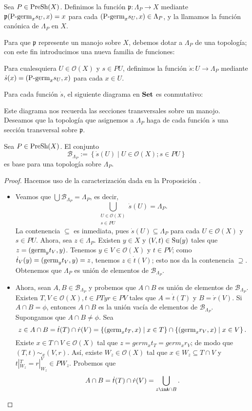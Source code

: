 \begin{Def}
   Sea $P\in\normalfont{\text{PreSh}}(X)$. Definimos la función $\mathfrak{p}:\Lambda_P\to X$ mediante $\mathfrak{p}(\normalfont{\text{P-germ}}_{x}s_{U},x)=x$ para cada $(\normalfont{\text{P-germ}}_{x}s_{U},x)\in\Lambda_P$, y la llamamos la función canónica de $\Lambda_P$ en $X$. 
\end{Def}
Para que $\mathfrak{p}$ represente un manojo sobre $X$, debemos dotar a $\Lambda_P$ de una topología; con este fin introducimos una nueva familia de funciones:
\begin{Def}
   Para cualesquiera $U\in\mathcal{O}(X)$ y $s\in PU$, definimos la función $\dot{s}:U\to\Lambda_P$ mediante $\dot{s}(x)=(\normalfont{\text{P-germ}}_{x}s_{U},x)$ para cada $x\in U$.
\end{Def}
Para cada función $\dot{s}$, el siguiente diagrama en $\normalfont{\textbf{Set}}$ es conmutativo:
   
Este diagrama nos recuerda las secciones transversales sobre un manojo. Deseamos que la topología que asignemos a $\Lambda_P$ haga de cada función $\dot{s}$ una sección transversal sobre $\mathfrak{p}$.
\begin{Prop}
   Sea $P\in\normalfont{\text{PreSh}}(X)$. El conjunto
   $$
      \mathcal{B}_{\Lambda_P}:=\left\lbrace \dot{s}(U)\mid U\in\mathcal{O}(X);s\in PU\right\rbrace
   $$
   es base para una topología sobre $\Lambda_P$.
\end{Prop}
\begin{proof}
   Hacemos uso de la caracterización dada en la Proposición .
   \begin{itemize}
      \item Veamos que $\bigcup \mathcal{B}_{\Lambda_P}=\Lambda_P$, es decir,
      $$
         \bigcup_{\substack{U\in\mathcal{O}(X) \\ s\in PU}}\dot{s}(U)=\Lambda_P.
      $$
      La contenencia $\subseteq$ es inmediata, pues $\dot{s}(U)\subseteq\Lambda_P$ para cada $U\in\mathcal{O}(X)$ y $s\in PU$. Ahora, sea $z\in\Lambda_{P}$. Existen $y\in X$ y $(V,t)\in\normalfont{\text{Su}}(y)$ tales que $z=(\normalfont{\text{germ}}_{y}t_{V},y)$. Tenemos $y\in V\in\mathcal{O}(X)$ y $t\in PV$; como $\dot{t}_{V}(y)=(\normalfont{\text{germ}}_{y}t_{V},y)=z$, tenemos $z\in\dot{t}(V)$; esto nos da la contenencia $\supseteq$. Obtenemos que $\Lambda_P$ es unión de elementos de $\mathcal{B}_{\Lambda_P}$.
   \item Ahora, sean $A,B\in\mathcal{B}_{\Lambda_P}$ y probemos que $A\cap B$ es unión de elementos de $\mathcal{B}_{\Lambda_P}$. Existen $T,V\in\mathcal{O}(X), t\in PT y r\in PV$ tales que $A=\dot{t}(T)$ y $B=\dot{r}(V)$. Si $A\cap B=\phi$, entonces $A\cap B$ es la unión vacía de elementos de $\mathcal{B}_{\Lambda_P}$. Supongamos que $A\cap B\neq\phi$. Sea
      $$ 
         z\in A\cap B =\dot{t}(T)\cap\dot{r}(V)=\left\lbrace (\normalfont{\text{germ}}_{x}t_{T},x)\mid x\in T\right\rbrace\cap\left\lbrace (\normalfont{\text{germ}}_{x}r_{V},x)\mid x\in V\right\rbrace.
      $$
      Existe $x\in T\cap V\in \mathcal{O}(X)$ tal que $z=germ_{x}t_{T}=germ_{x}r_{V}$; de modo que $(T,t)\sim_{x}(V,r)$. Así, existe $W_{z}\in\mathcal{O}(X)$ tal que $x\in W_z\subseteq T\cap V$ y $t|^{T}_{W_z}=r|^{V}_{W_z}\in PW_{z}$. Probemos que
      $$
         A\cap B=\dot{t}(T)\cap\dot{r}(V)=\bigcup_{z\inA\cap B}.
      $$
   \end{itemize}
\end{proof}

